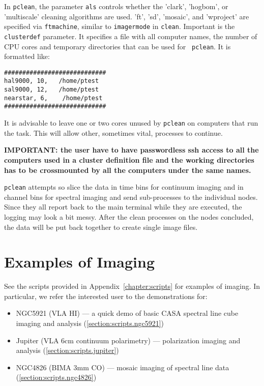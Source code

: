 In {\tt pclean}, the parameter {\tt als} controls whether the 'clark',
'hogbom', or 'multiscale' cleaning algorithms are used. 'ft', 'sd',
'mosaic', and 'wproject' are specified via {\tt ftmachine}, similar to
{\tt imagermode} in {\tt clean}. Important is the {\tt clusterdef}
parameter. It specifies a file with all computer names, the number of
CPU cores and temporary directories that can be used for {\tt
  pclean}. It is formatted like:

\small
\begin{verbatim}
############################
hal9000, 10,   /home/ptest
sal9000, 12,   /home/ptest
nearstar, 6,    /home/ptest
############################
\end{verbatim}
\normalsize

It is advisable to leave one or two cores unused by {\tt pclean} on
computers that run the task. This will allow other, sometimes vital,
processes to continue. 

{\bf IMPORTANT: the user have to have passwordless ssh access to all
  the computers used in a cluster definition file and the working
  directories has to be crossmounted by all the computers under the
  same names.}


{\tt pclean} attempts so slice the data in time bins for continuum
imaging and in channel bins for spectral imaging and send
sub-processes to the individual nodes. Since they all report back to
the main terminal while they are executed, the logging may look a bit
messy. After the clean processes on the nodes concluded, the data will
be put back together to create single image files.




\section{Examples of Imaging}
\label{section:im.examples}

See the scripts provided in Appendix~\ref{chapter:scripts} for examples of
imaging.  In particular, we refer
the interested user to the demonstrations for:
\begin{itemize}
\item NGC5921 (VLA HI) --- a quick demo of basic CASA spectral line
      cube imaging and analysis
      (\ref{section:scripts.ngc5921})
\item Jupiter (VLA 6cm continuum polarimetry) --- polarization imaging
      and analysis
      (\ref{section:scripts.jupiter})
\item NGC4826 (BIMA 3mm CO) --- mosaic imaging of spectral line data
      (\ref{section:scripts.ngc4826})
\end{itemize}

